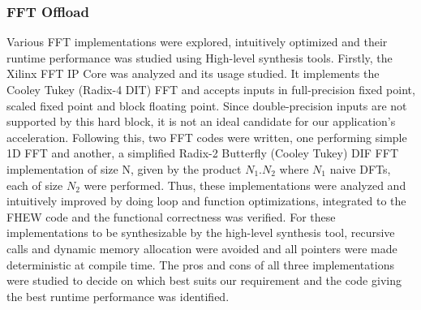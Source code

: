 \subsubsection*{FFT Offload}
Various FFT implementations were explored, intuitively optimized and their runtime performance was studied using High-level synthesis tools. 
Firstly, the Xilinx FFT IP Core \cite{logicore2012fast} was analyzed and its usage studied. It implements the Cooley Tukey (Radix-4 DIT) FFT and accepts inputs in full-precision fixed point, scaled fixed point and block floating point. Since double-precision inputs are not supported by this hard block, it is not an ideal candidate for our application's acceleration. Following this, two FFT codes were written, one performing simple 1D FFT and another, a simplified Radix-2 Butterfly (Cooley Tukey) DIF FFT implementation of size N, given by the product $N_1$.$N_2$ where $N_1$ naive DFTs, each of size $N_2$ were performed. 
Thus, these implementations were analyzed and intuitively improved by doing loop and function optimizations, integrated to the FHEW code and the functional correctness was verified. \newline For these implementations to be synthesizable by the high-level synthesis tool, recursive calls and dynamic memory allocation were avoided and all pointers were made deterministic at compile time. The pros and cons of all three implementations were studied to decide on which best suits our requirement and the code giving the best runtime performance was identified.
